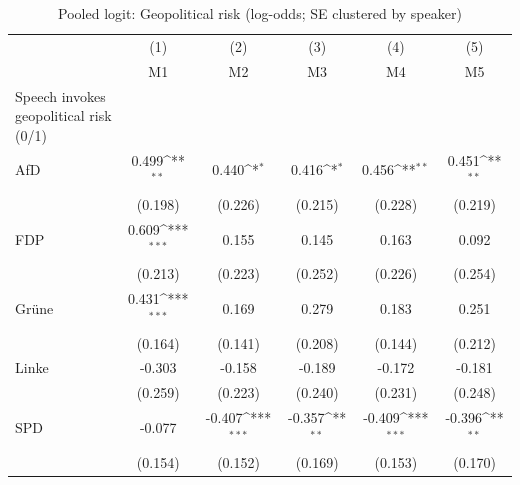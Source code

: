 \begin{table}[htbp]\centering
\def\sym#1{\ifmmode^{#1}\else\(^{#1}\)\fi}
\caption{Pooled logit: Geopolitical risk (log-odds; SE clustered by speaker)}
\begin{tabular}{l*{5}{c}}
\toprule
                    &\multicolumn{1}{c}{(1)}&\multicolumn{1}{c}{(2)}&\multicolumn{1}{c}{(3)}&\multicolumn{1}{c}{(4)}&\multicolumn{1}{c}{(5)}\\
                    &\multicolumn{1}{c}{M1}&\multicolumn{1}{c}{M2}&\multicolumn{1}{c}{M3}&\multicolumn{1}{c}{M4}&\multicolumn{1}{c}{M5}\\
\midrule
Speech invokes geopolitical risk (0/1)&                     &                     &                     &                     &                     \\
AfD                 &       0.499\sym{**} &       0.440\sym{*}  &       0.416\sym{*}  &       0.456\sym{**} &       0.451\sym{**} \\
                    &     (0.198)         &     (0.226)         &     (0.215)         &     (0.228)         &     (0.219)         \\
\addlinespace
FDP                 &       0.609\sym{***}&       0.155         &       0.145         &       0.163         &       0.092         \\
                    &     (0.213)         &     (0.223)         &     (0.252)         &     (0.226)         &     (0.254)         \\
\addlinespace
Grüne               &       0.431\sym{***}&       0.169         &       0.279         &       0.183         &       0.251         \\
                    &     (0.164)         &     (0.141)         &     (0.208)         &     (0.144)         &     (0.212)         \\
\addlinespace
Linke               &      -0.303         &      -0.158         &      -0.189         &      -0.172         &      -0.181         \\
                    &     (0.259)         &     (0.223)         &     (0.240)         &     (0.231)         &     (0.248)         \\
\addlinespace
SPD                 &      -0.077         &      -0.407\sym{***}&      -0.357\sym{**} &      -0.409\sym{***}&      -0.396\sym{**} \\
                    &     (0.154)         &     (0.152)         &     (0.169)         &     (0.153)         &     (0.170)         \\

\end{tabular}
\end{table}
